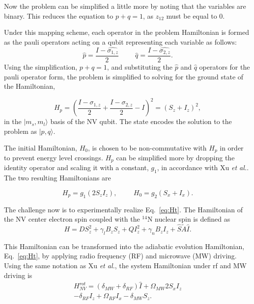 \documentclass[%
 reprint,
 amsmath,amssymb,
 aps,
]{revtex4-1}
\begin{document}
	 Now the problem can be simplified a little more by noting that the variables are binary. This reduces the equation to $p+q=1$, as $z_{12}$ must be equal to 0.	 
	 
	  Under this mapping scheme, each operator in the problem Hamiltonian is formed as the pauli operators acting on a qubit representing each variable as follows:
	\begin{equation}
	  \hat{p} = \dfrac{I-\hat{\sigma_{1,z}}}{2} \hspace{1cm}   \hat{q} = \dfrac{I-\hat{\sigma_{2,z}}}{2}.
	\end{equation}
Using the simplification, $p+q=1$, and substituting the $\hat{p}$ and $\hat{q}$ operators for the pauli operator form, the problem is simplified to solving for the ground state of the Hamiltonian,
	
\begin{equation}
	H_p = \left( \dfrac{I-\sigma_{1,z}}{2} + \dfrac{I-\sigma_{2,z}}{2} - I\right)^2 = \left(S_z + I_z \right)^2 ,
\end{equation}
in the $\vert m_s,m_l \rangle$ basis of the NV qubit. The state encodes the solution to the problem as   $\vert p,q \rangle$.

	The initial Hamiltonian, $H_0$, is chosen to be non-commutative with $H_p$ in order to prevent energy level crossings. $H_p$ can be simplified more by dropping the identity operator and scaling it with a constant, $g_1$, in accordance with Xu \textit{et al.}. The two resulting Hamiltonians are

\begin{equation}
	H_p = g_1\left(2S_zI_z\right), \hspace{1cm} H_0 = g_2\left(S_x + I_x\right) .
\end{equation}

	The challenge now is to experimentally realize Eq.~\ref{eq:Ht}. The Hamiltonian of the NV center electron spin coupled with the $^{14}$N nuclear spin is defined as
	\begin{equation}
		H = DS_z^2 + \gamma_lB_zS_z + QI_z^2 + \gamma_nB_zI_z + \hat{S}\tilde{A}\hat{I}.
	\end{equation}

	This Hamiltonian can be transformed into the adiabatic evolution Hamiltonian, Eq.~\ref{eq:Ht}, by applying radio frequency (RF) and microwave (MW) driving\cite{Kong2016}. Using the same notation as Xu \textit{et al.}, the system Hamiltonian under rf and MW driving is
	\begin{equation}
	\begin{split}
		H^{rot}_{NV} = \left( \delta_{MW} + \delta_{RF} \right)\hat{I} + \Omega_{MW}2S_xI_z \\ - \delta_{RF}I_z + \Omega_{RF}I_x - \delta_{MW}S_z.
	\end{split}
	\label{eq:rotNV}
	\end{equation}
	
\end{document}
